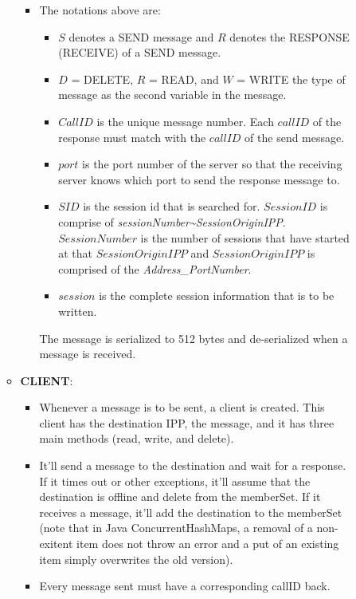 \documentclass{article}
\begin{document}
\begin{description}
\begin{itemize}
\begin{itemize}
\begin{itemize}
                \item The notations above are:
                  \begin{itemize}
                    \item $S$ denotes a SEND message and $R$ denotes the RESPONSE (RECEIVE) of a SEND message.
                    \item $D$ = DELETE, $R$ = READ, and $W$ = WRITE the type of message as the second variable in the message.
                    \item $CallID$ is the unique message number. Each $callID$ of the response must match with the $callID$ of the send message.
                    \item $port$ is the port number of the server so that the receiving server knows which port to send the response message to.
                    \item $SID$ is the session id that is searched for. $SessionID$ is comprise of \emph{sessionNumber\textasciitilde{}SessionOriginIPP}. $SessionNumber$ is the number of sessions that have started at that $SessionOriginIPP$ and $SessionOriginIPP$ is comprised of the \emph{Address\_PortNumber}.
                    \item $session$ is the complete session information that is to be written.
                  \end{itemize}
              The message is serialized to 512 bytes and de-serialized when a message is received.
              \end{itemize}
            \item \textbf{CLIENT}:
              \begin{itemize} 
                \item Whenever a message is to be sent, a client is created. This client has the destination IPP, the message, and it has three main methods (read, write, and delete). 
                \item It'll send a message to the destination and wait for a response. If it times out or other exceptions, it'll assume that the destination is offline and delete from the memberSet. If it receives a message, it'll add the destination to the memberSet (note that in Java ConcurrentHashMaps, a removal of a non-exitent item does not throw an error and a put of an existing item simply overwrites the old version). 
                \item Every message sent must have a corresponding callID back.
              \end{itemize}

\end{itemize}
\end{itemize}
\end{description}
\end{document}
